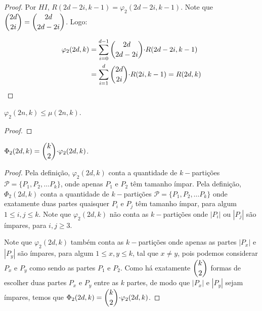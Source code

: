 \documentclass[12pt]{article}
\begin{document}
\begin{proof}
  	Por $HI$, $R(2d - 2i, k-1) = \varphi_2(2d - 2i, k-1)$. Note que $\escolhe{2d}{2i} = \escolhe{2d}{2d - 2i} $. Logo:
  	
  	\begin{align}
  		\begin{split}
  			\varphi_2(2d, k) &= \sum\limits_{i = 0}^{d-1}\escolhe{2d}{2d - 2i} {\cdot} R(2d - 2i, k-1)\\
  			&= \sum\limits_{i = 1}^{d}\escolhe{2d}{2i} {\cdot} R(2i, k-1) = R(2d, k)
  		\end{split} 
  	\end{align}  
  	
  	\end{proof} \newl
  
   \begin{lema}  
  	\label{lema4} 
  	$\varphi_2(2n, k) \leq \mu(2n, k)$.
  \end{lema}
  
  \begin{proof} 
  	
  \end{proof} \newpage

  
  \begin{lema}  
  	\label{lema5} 
  	$\Phi_2(2d, k) = \escolhe{k}{2} {\cdot} \varphi_2(2d, k)$.
  \end{lema}
  
  \begin{proof}
  	Pela definição, $\varphi_2(2d, k)$ conta a quantidade de $k-$partições $\mathcal{P} = \{ P_1, P_2, \ldots P_k \}$, onde apenas $P_1$ e $P_2$ têm tamanho ímpar. Pela definição, $\Phi_2(2d, k)$ conta a quantidade de $k-$partições $\mathcal{P} = \{ P_1, P_2, \ldots P_k \}$ onde exatamente duas partes quaisquer $P_i$ e $P_j$ têm tamanho ímpar, para algum $1 \leq i, j \leq k$. Note que $\varphi_2(2d, k)$ não conta as $k-$partições onde $|P_i|$ ou $|P_j|$ são ímpares, para $i, j \geq 3$.
 
 	Note que $\varphi_2(2d, k)$ também conta as $k-$partições onde apenas as partes $|P_x|$ e $|P_y|$ são ímpares, para algum $1 \leq x, y \leq k $, tal que $x \neq y$, pois podemos considerar $P_x$ e $P_y$ como sendo as partes $P_1$ e $P_2$.  Como há exatamente $\escolhe{k}{2}$ formas de escolher duas partes $P_x$ e $P_y$ entre as $k$ partes, de modo que $|P_x|$ e $|P_y|$ sejam ímpares, temos que $\Phi_2(2d, k) = \escolhe{k}{2} {\cdot} \varphi_2(2d, k)$.
 	
  \end{proof}\newl
  
\end{document}
